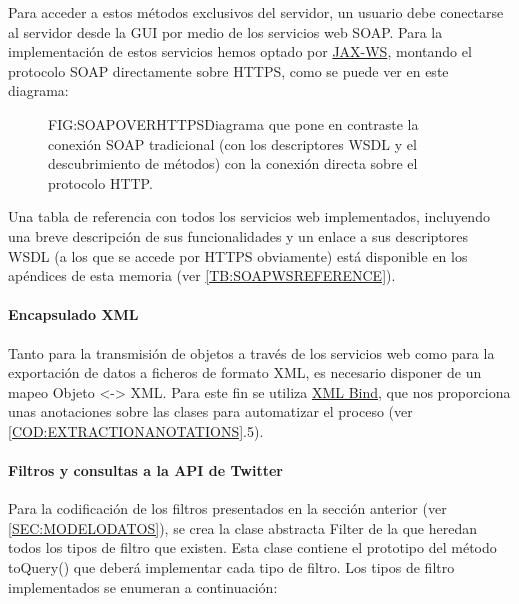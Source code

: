 Para acceder a estos métodos exclusivos del servidor, un usuario debe conectarse al servidor desde la GUI por medio de los servicios web SOAP. Para la implementación de estos servicios hemos optado por \href{https://docs.oracle.com/javaee/6/tutorial/doc/bnayl.html}{JAX-WS}, montando el protocolo SOAP directamente sobre HTTPS, como se puede ver en este diagrama:

 \begin{figure}[Diagrama conexión SOAP+HTTPS]{FIG:SOAPOVERHTTPS}{Diagrama que pone en contraste la conexión SOAP tradicional (con los descriptores WSDL y el descubrimiento de métodos) con la conexión directa sobre el protocolo HTTP.}
 \end{figure}

Una tabla de referencia con todos los servicios web implementados, incluyendo una breve descripción de sus funcionalidades y un enlace a sus descriptores WSDL (a los que se accede por HTTPS obviamente) está disponible en los apéndices de esta memoria (ver \ref{TB:SOAPWSREFERENCE}).

\paragraph{Encapsulado XML}
Tanto para la transmisión de objetos a través de los servicios web como para la exportación de datos a ficheros de formato XML, es necesario disponer de un mapeo Objeto <-> XML. Para este fin se utiliza \href{https://docs.oracle.com/javase/7/docs/api/javax/xml/bind/package-summary.html}{XML Bind}, que nos proporciona unas anotaciones sobre las clases para automatizar el proceso (ver \cref{COD:EXTRACTIONANOTATIONS}.5).\newpage

\paragraph{Filtros y consultas a la API de Twitter}
Para la codificación de los filtros presentados en la sección anterior (ver \ref{SEC:MODELODATOS}), se crea la clase abstracta Filter de la que heredan todos los tipos de filtro que existen. Esta clase contiene el prototipo del método toQuery() que deberá implementar cada tipo de filtro. Los tipos de filtro implementados se enumeran a continuación:

